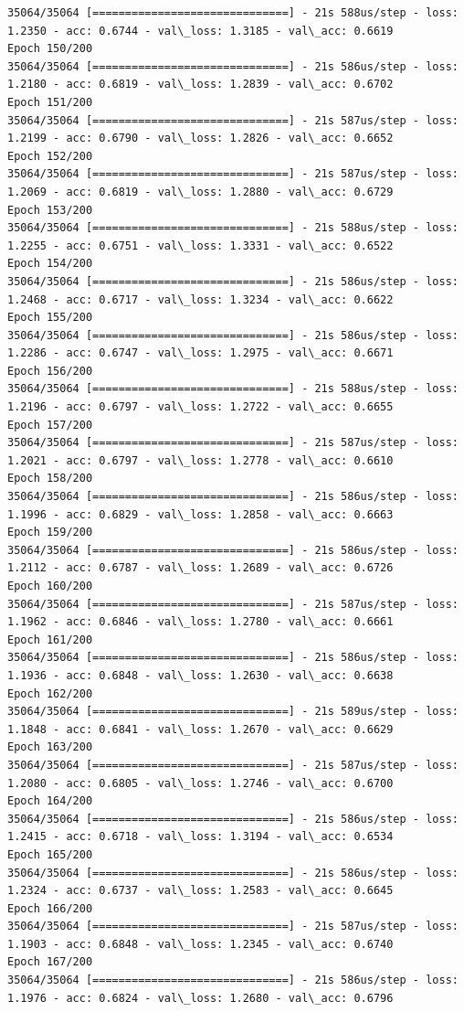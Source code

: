 \documentclass[11pt]{article}
\begin{document}
\begin{Verbatim}[commandchars=\\\{\}]
35064/35064 [==============================] - 21s 588us/step - loss: 1.2350 - acc: 0.6744 - val\_loss: 1.3185 - val\_acc: 0.6619
Epoch 150/200
35064/35064 [==============================] - 21s 586us/step - loss: 1.2180 - acc: 0.6819 - val\_loss: 1.2839 - val\_acc: 0.6702
Epoch 151/200
35064/35064 [==============================] - 21s 587us/step - loss: 1.2199 - acc: 0.6790 - val\_loss: 1.2826 - val\_acc: 0.6652
Epoch 152/200
35064/35064 [==============================] - 21s 587us/step - loss: 1.2069 - acc: 0.6819 - val\_loss: 1.2880 - val\_acc: 0.6729
Epoch 153/200
35064/35064 [==============================] - 21s 588us/step - loss: 1.2255 - acc: 0.6751 - val\_loss: 1.3331 - val\_acc: 0.6522
Epoch 154/200
35064/35064 [==============================] - 21s 586us/step - loss: 1.2468 - acc: 0.6717 - val\_loss: 1.3234 - val\_acc: 0.6622
Epoch 155/200
35064/35064 [==============================] - 21s 586us/step - loss: 1.2286 - acc: 0.6747 - val\_loss: 1.2975 - val\_acc: 0.6671
Epoch 156/200
35064/35064 [==============================] - 21s 588us/step - loss: 1.2196 - acc: 0.6797 - val\_loss: 1.2722 - val\_acc: 0.6655
Epoch 157/200
35064/35064 [==============================] - 21s 587us/step - loss: 1.2021 - acc: 0.6797 - val\_loss: 1.2778 - val\_acc: 0.6610
Epoch 158/200
35064/35064 [==============================] - 21s 586us/step - loss: 1.1996 - acc: 0.6829 - val\_loss: 1.2858 - val\_acc: 0.6663
Epoch 159/200
35064/35064 [==============================] - 21s 586us/step - loss: 1.2112 - acc: 0.6787 - val\_loss: 1.2689 - val\_acc: 0.6726
Epoch 160/200
35064/35064 [==============================] - 21s 587us/step - loss: 1.1962 - acc: 0.6846 - val\_loss: 1.2780 - val\_acc: 0.6661
Epoch 161/200
35064/35064 [==============================] - 21s 586us/step - loss: 1.1936 - acc: 0.6848 - val\_loss: 1.2630 - val\_acc: 0.6638
Epoch 162/200
35064/35064 [==============================] - 21s 589us/step - loss: 1.1848 - acc: 0.6841 - val\_loss: 1.2670 - val\_acc: 0.6629
Epoch 163/200
35064/35064 [==============================] - 21s 587us/step - loss: 1.2080 - acc: 0.6805 - val\_loss: 1.2746 - val\_acc: 0.6700
Epoch 164/200
35064/35064 [==============================] - 21s 586us/step - loss: 1.2415 - acc: 0.6718 - val\_loss: 1.3194 - val\_acc: 0.6534
Epoch 165/200
35064/35064 [==============================] - 21s 586us/step - loss: 1.2324 - acc: 0.6737 - val\_loss: 1.2583 - val\_acc: 0.6645
Epoch 166/200
35064/35064 [==============================] - 21s 587us/step - loss: 1.1903 - acc: 0.6848 - val\_loss: 1.2345 - val\_acc: 0.6740
Epoch 167/200
35064/35064 [==============================] - 21s 586us/step - loss: 1.1976 - acc: 0.6824 - val\_loss: 1.2680 - val\_acc: 0.6796

\end{Verbatim}
\end{document}
